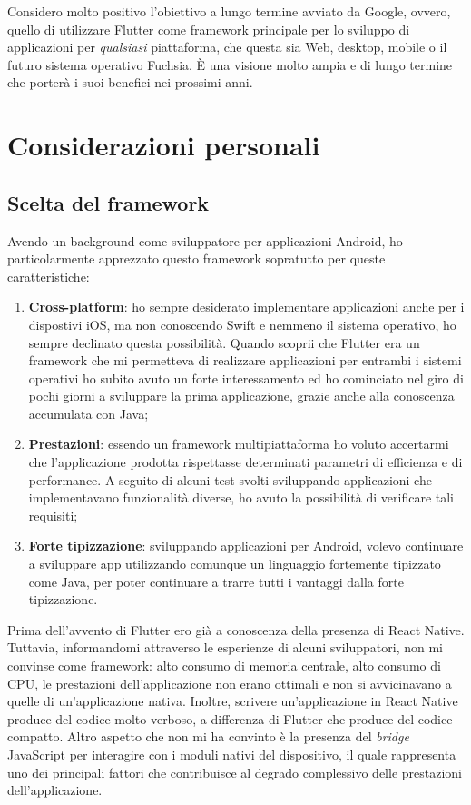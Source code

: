 Considero molto positivo l'obiettivo a lungo termine avviato da Google, ovvero, quello di utilizzare Flutter come framework principale per lo sviluppo di applicazioni per \textit{qualsiasi} piattaforma, che questa sia Web, desktop, mobile o il futuro sistema operativo Fuchsia. È una visione molto ampia e di lungo termine che porterà i suoi benefici nei prossimi anni.

\section{Considerazioni personali}

\subsection{Scelta del framework}
Avendo un background come sviluppatore per applicazioni Android, ho particolarmente apprezzato questo framework sopratutto per queste caratteristiche:
\begin{enumerate}
	\item \textbf{Cross-platform}: ho sempre desiderato implementare applicazioni anche per i dispostivi iOS, ma non conoscendo Swift e nemmeno il sistema operativo, ho sempre declinato questa possibilità. Quando scoprii che Flutter era un framework che mi permetteva di realizzare applicazioni per entrambi i sistemi operativi ho subito avuto un forte interessamento ed ho cominciato nel giro di pochi giorni a sviluppare la prima applicazione, grazie anche alla conoscenza accumulata con Java;
	\item \textbf{Prestazioni}: essendo un framework multipiattaforma ho voluto accertarmi che l'applicazione prodotta rispettasse determinati parametri di efficienza e di performance. A seguito di alcuni test svolti sviluppando applicazioni che implementavano funzionalità diverse, ho avuto la possibilità di verificare tali requisiti;
	\item \textbf{Forte tipizzazione}: sviluppando applicazioni per Android, volevo continuare a sviluppare app utilizzando comunque un linguaggio fortemente tipizzato come Java, per poter continuare a trarre tutti i vantaggi dalla forte tipizzazione.
\end{enumerate}

Prima dell'avvento di Flutter ero già a conoscenza della presenza di React Native. Tuttavia, informandomi attraverso le esperienze di alcuni sviluppatori, non mi convinse come framework: alto consumo di memoria centrale, alto consumo di CPU, le prestazioni dell'applicazione non erano ottimali e non si avvicinavano a quelle di un'applicazione nativa. Inoltre, scrivere un'applicazione in React Native produce del codice molto verboso, a differenza di Flutter che produce del codice compatto. Altro aspetto che non mi ha convinto è la presenza del \textit{bridge} JavaScript per interagire con i moduli nativi del dispositivo, il quale rappresenta uno dei principali fattori che contribuisce al degrado complessivo delle prestazioni dell'applicazione.


